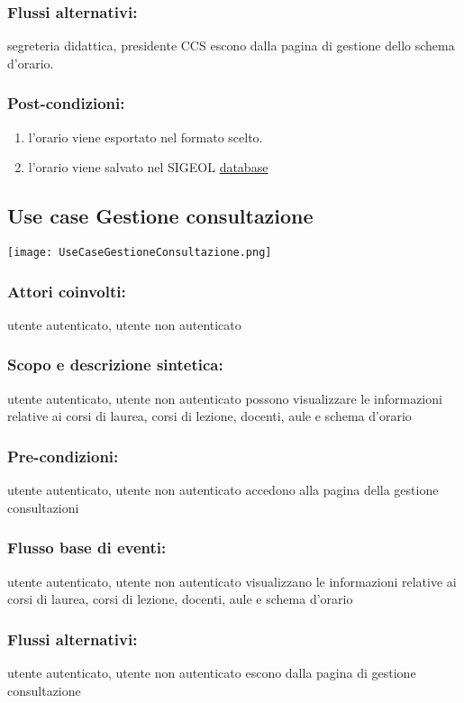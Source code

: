 \documentclass[11pt,a4paper]{article}
\begin{document}
\subsubsection*{Flussi alternativi:}
 segreteria didattica, presidente CCS escono dalla pagina di gestione dello schema d'orario.
\subsubsection*{Post-condizioni:}
\begin{enumerate}
 \item l'orario viene esportato nel formato scelto.
 \item l'orario viene salvato nel SIGEOL \underline{database}
\end{enumerate}  

\subsection{Use case Gestione consultazione}
\begin{center} 
 \texttt{[image: UseCaseGestioneConsultazione.png]}
\end{center}
\subsubsection*{Attori coinvolti:}
utente autenticato, utente non autenticato
\subsubsection*{Scopo e descrizione sintetica:}
utente autenticato, utente non autenticato possono visualizzare le informazioni relative ai corsi di laurea, corsi di lezione, docenti, aule e schema d'orario
\subsubsection*{Pre-condizioni:}
utente autenticato, utente non autenticato accedono alla pagina della gestione consultazioni
\subsubsection*{Flusso base di eventi:}
utente autenticato, utente non autenticato visualizzano le informazioni relative ai corsi di laurea, corsi di lezione, docenti, aule e schema d'orario
\subsubsection*{Flussi alternativi:}
 utente autenticato, utente non autenticato escono dalla pagina di gestione consultazione
\end{document}
